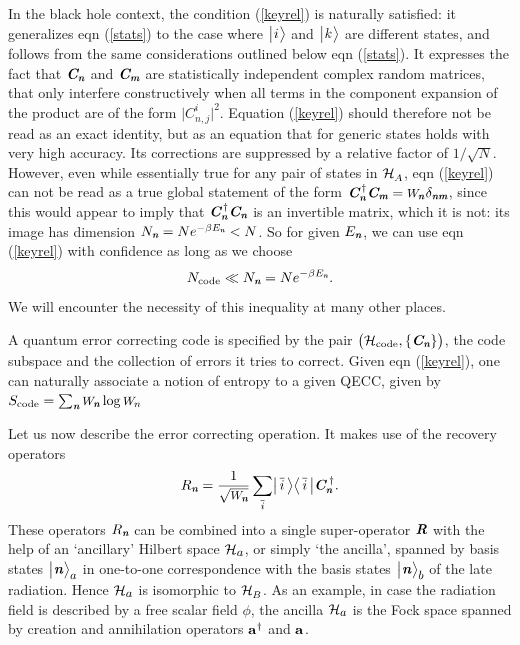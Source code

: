\documentclass[12pt]{article}%
\def\spc{\hspace{.5pt}}
\def\be{\begin{equation}}
\def\ee{\end{equation}}
\begin{document}
In the black hole context, the condition (\ref{keyrel}) is naturally
satisfied: it generalizes eqn (\ref{stats}) to the case where $\bigl|\spc i \spc \ra$ and $\bigl|\spc k \spc \ra$ are different states, and follows from
the same considerations outlined below eqn (\ref{stats}).  It expresses the fact that $\mbox{\textit{\textbf{C}\!\,}}_{ \textit{\textbf n}}$ and $\mbox{\textit{\textbf{C}\!\,}}_{ \textit{\textbf m}}$ are statistically
 independent complex random matrices, that only interfere constructively when all terms in the component expansion of the product are of
 the form $\bigl|C_{n,j}^i|^2$. Equation (\ref{keyrel}) should therefore not be read as an exact identity, but as an equation that for generic states holds with
 very high accuracy.  Its corrections are suppressed by a relative factor of $1/\sqrt{N}$. 
However, even while essentially true for any pair of states in ${\cal H}_\AA$, eqn (\ref{keyrel}) can not be read as a true global statement of the form ${\cC^{\, \dag}_\nomt \cC_\momt} = \pp_\nom\spc \delta_{\nom\mom}$, since this would appear to imply that  
${\mbox{\textit{\textbf{C}\!\,}}^{\, \dag}_{ \textit{\textbf n}} \mbox{\textit{\textbf{C}\!\,}}_{ \textit{\textbf n}}}$ is an invertible matrix, which it is not:  its image has dimension
$N_{ \textit{\textbf n}} = N e^{-\beta E_{ \textit{\textbf n}}} < N$. So for given $E_{ \textit{\textbf n}}$, we can use eqn (\ref{keyrel}) with confidence as long as we choose
$$
{N_{\rm code}} \ll N_{ \textit{\textbf n}}=Ne^{-\beta E_{ \textit{\textbf n}}}.
$$ 
We will encounter the necessity of this inequality at many other places.

A quantum error correcting code is specified by the pair $\bigl({\cal H}_{\rm code}, \{ \cC_\nom\} \bigr)$, the code subspace and the collection of errors it tries to correct.
Given eqn (\ref{keyrel}), one can naturally associate a notion of entropy to a given QECC, given by $S_{\rm code} = \sum_\nom \pp_\nom \log \pp_n$


\def\overlinde{{}}

Let us now describe the error correcting operation. It makes use of the recovery operators 
\be
\label{recover}
R_\nom = \frac 1 {\sqrt{\pp_\nomt}} \sum_{\ibar} \bigl|\ibar \ra \la \ibar \bigr|  \cC^{\; \dag}_\nom.
\ee
These operators $R_{ \textit{\textbf n}}$ can be combined into a single super-operator ${\textit{\textbf{R}\!\,}}$
with the help of an `ancillary' Hilbert space ${\cal H}_\aaaa$,  or simply  `the ancilla', spanned by basis states $\bigl|\spc\nom\spc\ra_\aaaa$ in one-to-one
correspondence with the basis states $\bigl|\spc\nom\spc\ra_\bbbb$ of the late radiation.
Hence ${\cal H}_\aaaa$ is isomorphic to ${\cal H}_\BB$. 
As an example, in case the radiation field is described by a free scalar field $\phi$, the ancilla ${\cal H}_\aaaa$
is the Fock space spanned by creation and annihilation
operators ${\bf a}^\dag$ and ${\bf a}$.
\end{document}
